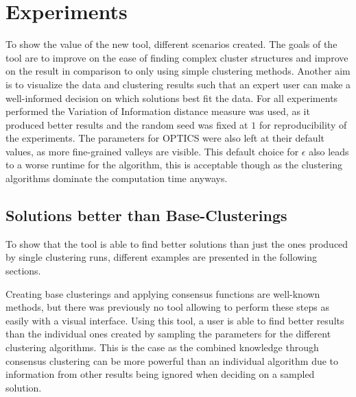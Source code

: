 \documentclass[
	a4paper,
	english,
	twoside,
	openright,               
	11pt                            
	]{report}
\begin{document}
\chapter{Experiments}\label{cha:experiments}
To show the value of the new tool, different scenarios created. The goals of the tool are to improve on the ease of finding complex cluster structures and improve on the result in comparison to only using simple clustering methods. Another aim is to visualize the data and clustering results such that an expert user can make a well-informed decision on which solutions best fit the data. For all experiments performed the Variation of Information distance measure was used, as it produced better results and the random seed was fixed at $1$ for reproducibility of the experiments. The parameters for OPTICS were also left at their default values, as more fine-grained valleys are visible. This default choice for $\epsilon$ also leads to a worse runtime for the algorithm, this is acceptable though as the clustering algorithms dominate the computation time anyways.

\section{Solutions better than Base-Clusterings}
To show that the tool is able to find better solutions than just the ones produced by single clustering runs, different examples are presented in the following sections. 

Creating base clusterings and applying consensus functions are well-known methods, but there was previously no tool allowing to perform these steps as easily with a visual interface. Using this tool, a user is able to find better results than the individual ones created by sampling the parameters for the different clustering algorithms. This is the case as the combined knowledge through consensus clustering can be more powerful than an individual algorithm due to information from other results being ignored when deciding on a sampled solution.
\end{document}
